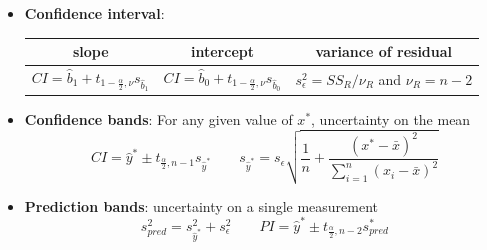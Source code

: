 \documentclass{article}
\begin{document}
\begin{itemize}
    \item \textbf{Confidence interval}:
     \begin{table}[H] \centering
    \begin{tabular}{c|c|c}

   slope & intercept & variance of residual \\ \hline
   $CI=\hat{b}_{1} + t_{1-\frac{\alpha}{2}, \nu}s_{\hat{b}_{1}}$ & $CI=\hat{b}_{0} + t_{1-\frac{\alpha}{2}, \nu}s_{\hat{b}_{0}}$ &
   $s_{\epsilon}^{2}= SS_{R}/\nu_{R}$ and $\nu_{R}=n-2$
    \end{tabular}\end{table}
    
    \item \textbf{Confidence bands}: For any given value of $x^*$, uncertainty on the mean
    \[CI = \hat{y}^{*}\pm t_{\frac{\alpha}{2}, n-1}s_{\hat{y}^{*}} \quad \quad s_{\hat{y}^{*}} = s_{\epsilon}\sqrt{\frac{1}{n}+\frac{(x^{*}-\bar{x})^{2}}{\sum_{i=1}^{n}(x_{i}-\bar{x})^{2}}}\]
    
    \item \textbf{Prediction bands}: uncertainty on a single measurement
    \[s_{pred}^{2} = s_{\hat{y}^{*}}^{2} + s_{\epsilon}^{2} \quad \quad PI=\hat{y}^{*}\pm t_{\frac{\alpha}{2}, n-2} s^{*}_{pred}\]
\end{itemize}
 

\vspace*{\fill}



\end{document}
